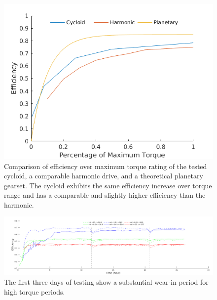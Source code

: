 \begin{figure}[t]
   \centering
   \includegraphics[width=\linewidth]{fig/eff_comp_v3}
   \caption{Comparison of efficiency over maximum torque rating of the tested cycloid, a comparable harmonic drive, and a theoretical planetary gearset.
   The cycloid exhibits the same efficiency increase over torque range and has a comparable and slightly higher efficiency than the harmonic.}
   \label{fig:eff_comp}
\end{figure}

\begin{figure}[t]
   \centering
   \includegraphics[width=\linewidth]{fig/burn_in}
   \caption{The first three days of testing show a substantial wear-in period for high torque periods.}
   \label{fig:break_in}
\end{figure}

